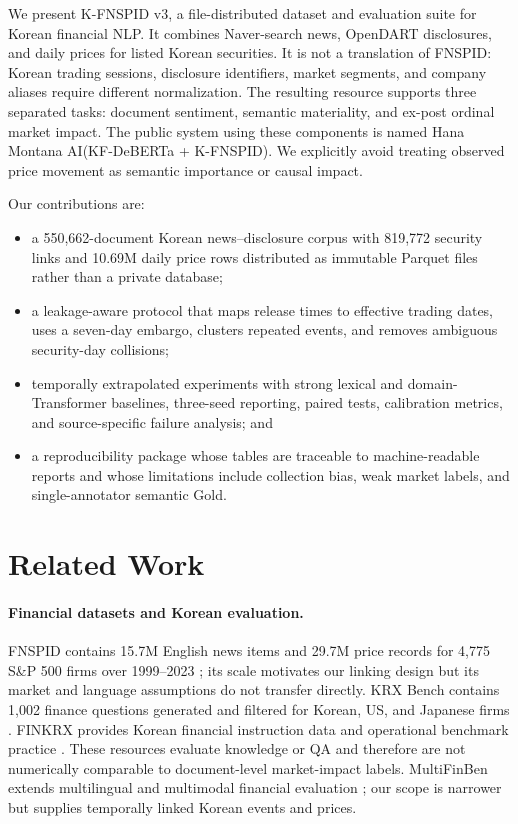 \documentclass[11pt]{article}
\newcommand{\dataset}{K-FNSPID v3}
\newcommand{\system}{Hana Montana AI(KF-DeBERTa + K-FNSPID)}
\begin{document}
We present \dataset, a file-distributed dataset and evaluation suite for Korean financial NLP. It combines Naver-search news, OpenDART disclosures, and daily prices for listed Korean securities. It is not a translation of FNSPID: Korean trading sessions, disclosure identifiers, market segments, and company aliases require different normalization. The resulting resource supports three separated tasks: document sentiment, semantic materiality, and ex-post ordinal market impact. The public system using these components is named \system. We explicitly avoid treating observed price movement as semantic importance or causal impact.

Our contributions are:
\begin{itemize}
  \item a 550,662-document Korean news--disclosure corpus with 819,772 security links and 10.69M daily price rows distributed as immutable Parquet files rather than a private database;
  \item a leakage-aware protocol that maps release times to effective trading dates, uses a seven-day embargo, clusters repeated events, and removes ambiguous security-day collisions;
  \item temporally extrapolated experiments with strong lexical and domain-Transformer baselines, three-seed reporting, paired tests, calibration metrics, and source-specific failure analysis; and
  \item a reproducibility package whose tables are traceable to machine-readable reports and whose limitations include collection bias, weak market labels, and single-annotator semantic Gold.
\end{itemize}

\section{Related Work}

\paragraph{Financial datasets and Korean evaluation.}
FNSPID contains 15.7M English news items and 29.7M price records for 4,775 S\&P 500 firms over 1999--2023 \citep{dong-etal-2024-fnspid}; its scale motivates our linking design but its market and language assumptions do not transfer directly. KRX Bench contains 1,002 finance questions generated and filtered for Korean, US, and Japanese firms \citep{son-etal-2024-krx}. FINKRX provides Korean financial instruction data and operational benchmark practice \citep{son-etal-2025-finkrx}. These resources evaluate knowledge or QA and therefore are not numerically comparable to document-level market-impact labels. MultiFinBen extends multilingual and multimodal financial evaluation \citep{peng-etal-2026-multifinben}; our scope is narrower but supplies temporally linked Korean events and prices.
\end{document}
